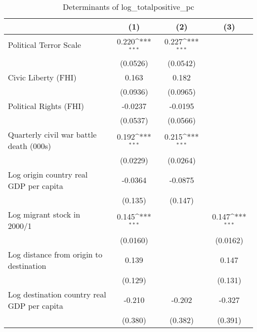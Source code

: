 \begin{table}[htbp]\centering
\def\sym#1{\ifmmode^{#1}\else\(^{#1}\)\fi}
\caption{Determinants of log\_totalpositive\_pc}
\begin{tabular}{l*{3}{c}}
\hline\hline
                    &\multicolumn{1}{c}{(1)}         &\multicolumn{1}{c}{(2)}         &\multicolumn{1}{c}{(3)}         \\
\hline
Political Terror Scale&       0.220\sym{***}&       0.227\sym{***}&                     \\
                    &    (0.0526)         &    (0.0542)         &                     \\
[1em]
Civic Liberty (FHI) &       0.163         &       0.182         &                     \\
                    &    (0.0936)         &    (0.0965)         &                     \\
[1em]
Political Rights (FHI)&     -0.0237         &     -0.0195         &                     \\
                    &    (0.0537)         &    (0.0566)         &                     \\
[1em]
Quarterly civil war battle death (000s)&       0.192\sym{***}&       0.215\sym{***}&                     \\
                    &    (0.0229)         &    (0.0264)         &                     \\
[1em]
Log origin country real GDP per capita&     -0.0364         &     -0.0875         &                     \\
                    &     (0.135)         &     (0.147)         &                     \\
[1em]
Log migrant stock in 2000/1&       0.145\sym{***}&                     &       0.147\sym{***}\\
                    &    (0.0160)         &                     &    (0.0162)         \\
[1em]
Log distance from origin to destination&       0.139         &                     &       0.147         \\
                    &     (0.129)         &                     &     (0.131)         \\
[1em]
Log destination country real GDP per capita&      -0.210         &      -0.202         &      -0.327         \\
                    &     (0.380)         &     (0.382)         &     (0.391)         \\

\end{tabular}
\end{table}
